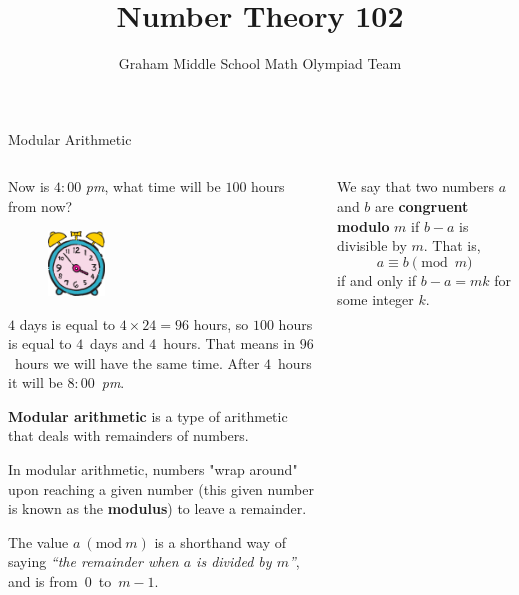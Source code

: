 \documentclass[9pt,aspectratio=169]{beamer}
\title{Number Theory 102}
\subtitle[Graham Middle School]{Graham Middle School Math Olympiad Team}
\newcommand{\Mod}[1]{\ (\mathrm{mod}\ #1)}
\begin{document}
\maketitle

\begin{frame}{Modular Arithmetic}
  \begin{columns}[T]
    \begin{column}{0.5\textwidth}
      \begin{problem}
        Now is $4{:}00$ \emph{pm}, what time will be $100$ hours from now? 
      \end{problem}

      \begin{figure}\centering
        \vspace*{-1.3ex}
        \includegraphics[width=0.25\textwidth]{01 - Modular arithmetic/clocks.png}
      \end{figure}

      $4$ days is equal to $4 \times 24 = 96$ hours, so $100$ hours is equal to $4$~days and $4$~hours. That means in $96$~hours we will have the same time. After $4$~hours it will be $8{:}00$~\emph{pm}.\medskip

      \begin{definition}
        \textbf{Modular arithmetic} is a type of arithmetic that deals with remainders of numbers.
      \end{definition}
      
      In modular arithmetic, numbers "wrap around" upon reaching a given number (this given number is known as the \textbf{modulus}) to leave a remainder.

      \begin{definition}
        The value $a \Mod{m}$ is a shorthand way of saying \emph{“the remainder when $a$ is divided by $m$”}, and is from~$0$~to~$m-1$.
      \end{definition}
    \end{column}
    \begin{column}{0.5\textwidth}
      \begin{definition}
        We say that two numbers $a$ and $b$ are \textbf{congruent modulo} $m$ if $b−a$ is
        divisible by $m$. That is,
        \[ a \equiv b \pmod{m} \]
        if and only if $b−a=mk$ for some integer $k$.
      \end{definition}


\end{column}
\end{columns}
\end{frame}
\end{document}
